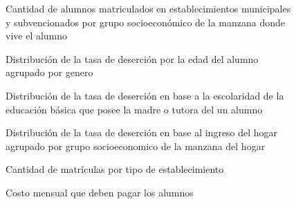 \begin{figure}
  \centering
      \caption{Cantidad de alumnos matriculados en establecimientos municipales y subvencionados por grupo socioeconómico de la manzana donde vive el alumno}
    \label{fig:came3}
\end{figure}

\begin{figure}
  \centering
      \caption{Distribución de la tasa de deserción por la edad del alumno agrupado por genero}
    \label{fig:came}
\end{figure}

\begin{figure}
  \centering
      \caption{Distribución de la tasa de deserción en base a la escolaridad de la educación básica que posee la madre o tutora del un alumno}
    \label{fig:tdm}
\end{figure}

\begin{figure}
  \centering
      \caption{Distribución de la tasa de deserción en base al ingreso del hogar agrupado por grupo socioeconomico de la manzana del hogar}
    \label{fig:tdih}
\end{figure}

\begin{figure}
  \centering
      \caption{Cantidad de matrículas por tipo de establecimiento}
    \label{fig:cme}
\end{figure}

\begin{figure}
  \centering
      \caption{Costo mensual que deben pagar los alumnos}
    \label{fig:cma}
\end{figure}